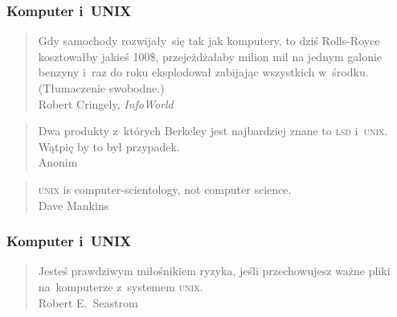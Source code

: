 \documentclass[10pt,t]{beamer}
\begin{document}
\begin{frame}
  \frametitle{Komputer i~UNIX}


  \begin{quote}

    Gdy samochody rozwijały~się tak jak komputery, to dziś Rolls-Royce
    kosztowałby jakieś 100\$, przejeżdżałaby milion mil na jednym galonie
    benzyny i~raz do roku eksplodował zabijając wszystkich w~środku.
    (Tłumaczenie swobodne.) \\
    Robert Cringely, \textit{InfoWorld}

  \end{quote}

  \vspace{2em}





  \begin{quote}

    Dwa produkty z~których Berkeley jest najbardziej znane to \textsc{lsd}
    i~\textsc{unix}. Wątpię by to był przypadek. \\
    Anonim

  \end{quote}

  \vspace{2em}





  \begin{quote}

    \textsc{unix} is computer-scientology, not computer science. \\
    Dave Mankins

  \end{quote}

\end{frame}





\begin{frame}
  \frametitle{Komputer i~UNIX}


  \begin{quote}

    Jesteś prawdziwym miłośnikiem ryzyka, jeśli przechowujesz ważne pliki
    na~komputerze z~systemem \textsc{unix}. \\
    Robert E.~Seastrom

  \end{quote}

\end{frame}
\end{document}
